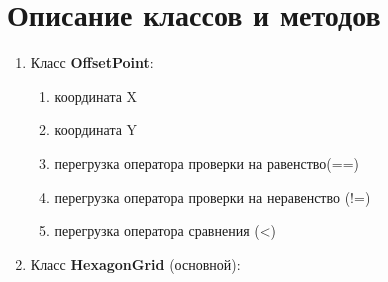 \section{Описание классов и методов}
\begin{enumerate}
\item Класс \textbf{OffsetPoint}:
	\begin{enumerate}
	\item координата X
	\item координата Y
	\item перегрузка оператора проверки на равенство(==)
	\item перегрузка оператора проверки на неравенство (!=)
	\item перегрузка оператора сравнения (<)
	\end {enumerate}
\item Класс \textbf{HexagonGrid} (основной):
	

\end{enumerate}
